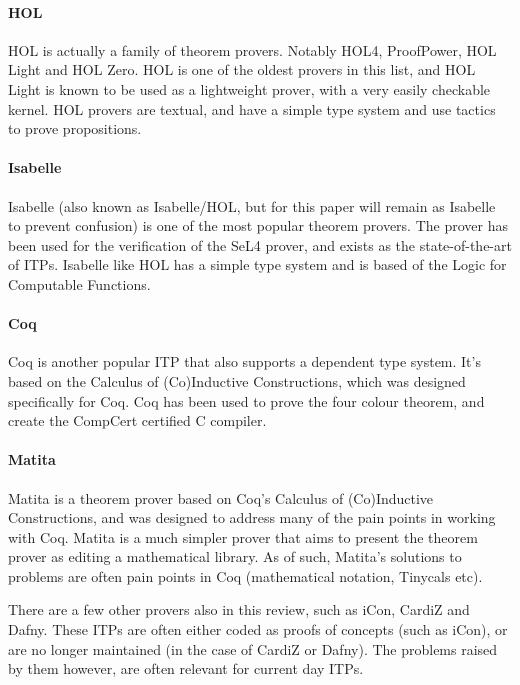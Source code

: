 \documentclass[
]{article}
\begin{document}
\hypertarget{hol}{%
\paragraph{HOL}\label{hol}}

HOL is actually a family of theorem provers. Notably HOL4, ProofPower,
HOL Light and HOL Zero. HOL is one of the oldest provers in this list,
and HOL Light is known to be used as a lightweight prover, with a very
easily checkable kernel. HOL provers are textual, and have a simple type
system and use tactics to prove propositions.

\hypertarget{isabelle}{%
\paragraph{Isabelle}\label{isabelle}}

Isabelle (also known as Isabelle/HOL, but for this paper will remain as
Isabelle to prevent confusion) is one of the most popular theorem
provers. The prover has been used for the verification of the SeL4
prover, and exists as the state-of-the-art of ITPs. Isabelle like HOL
has a simple type system and is based of the Logic for Computable
Functions.

\hypertarget{coq}{%
\paragraph{Coq}\label{coq}}

Coq is another popular ITP that also supports a dependent type system.
It's based on the Calculus of (Co)Inductive Constructions, which was
designed specifically for Coq. Coq has been used to prove the four
colour theorem, and create the CompCert certified C compiler.

\hypertarget{matita}{%
\paragraph{Matita}\label{matita}}

Matita is a theorem prover based on Coq's Calculus of (Co)Inductive
Constructions, and was designed to address many of the pain points in
working with Coq. Matita is a much simpler prover that aims to present
the theorem prover as editing a mathematical library. As of such,
Matita's solutions to problems are often pain points in Coq
(mathematical notation, Tinycals etc).

There are a few other provers also in this review, such as iCon, CardiZ
and Dafny. These ITPs are often either coded as proofs of concepts (such
as iCon), or are no longer maintained (in the case of CardiZ or Dafny).
The problems raised by them however, are often relevant for current day
ITPs.
\end{document}
